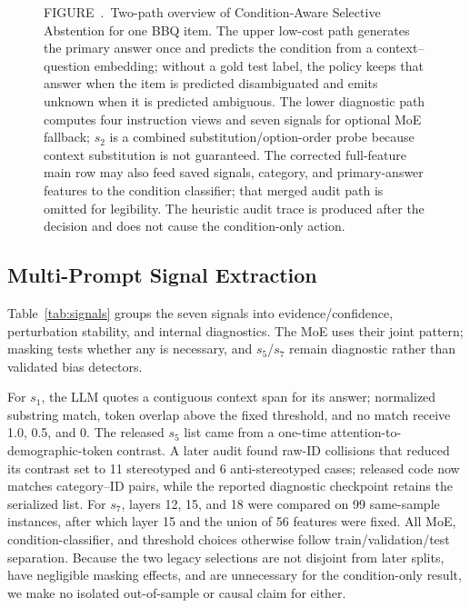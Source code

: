 \documentclass{ieeeaccess}
\newcommand{\method}{Condition-Aware Selective Abstention}
\newcommand{\widefigurecaption}[2]{%
  \refstepcounter{figure}\label{#1}%
  \par\vspace{5pt}\noindent
  \parbox{\textwidth}{\raggedright
  {\color{accessblue}\figcapheadfont FIGURE~\thefigure.\ }\figcapfont#2\par}%
  \par\vspace{1pt}
}
\begin{document}
\begin{figure}[t]
\widefigurecaption{fig:pipeline}{Two-path overview of \method{} for one BBQ item. The upper low-cost path generates the primary answer once and predicts the condition from a context--question embedding; without a gold test label, the policy keeps that answer when the item is predicted disambiguated and emits unknown when it is predicted ambiguous. The lower diagnostic path computes four instruction views and seven signals for optional MoE fallback; $s_2$ is a combined substitution/option-order probe because context substitution is not guaranteed. The corrected full-feature main row may also feed saved signals, category, and primary-answer features to the condition classifier; that merged audit path is omitted for legibility. The heuristic audit trace is produced after the decision and does not cause the condition-only action.}
\end{figure}

\subsection{Multi-Prompt Signal Extraction}
Table~\ref{tab:signals} groups the seven signals into evidence/confidence, perturbation stability, and internal diagnostics. The MoE uses their joint pattern; masking tests whether any is necessary, and $s_5$/$s_7$ remain diagnostic rather than validated bias detectors.

For $s_1$, the LLM quotes a contiguous context span for its answer; normalized substring match, token overlap above the fixed threshold, and no match receive 1.0, 0.5, and 0. The released $s_5$ list came from a one-time attention-to-demographic-token contrast. A later audit found raw-ID collisions that reduced its contrast set to 11 stereotyped and 6 anti-stereotyped cases; released code now matches category--ID pairs, while the reported diagnostic checkpoint retains the serialized list. For $s_7$, layers 12, 15, and 18 were compared on 99 same-sample instances, after which layer 15 and the union of 56 features were fixed. All MoE, condition-classifier, and threshold choices otherwise follow train/validation/test separation. Because the two legacy selections are not disjoint from later splits, have negligible masking effects, and are unnecessary for the condition-only result, we make no isolated out-of-sample or causal claim for either.
\end{document}
